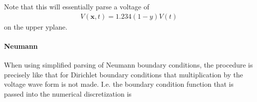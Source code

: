 \documentclass[letterpaper,10pt,english]{sphinxmanual}
\begin{document}
\begin{sphinxVerbatim}[commandchars=\\\{\},formatcom=\scriptsize]
   \PYG{p}{[}\PYG{p}{]}        
       \PYG{p}{[}\PYG{p}{]}
      

  
\end{sphinxVerbatim}

Note that this will essentially parse a voltage of
\begin{equation*}
\begin{split}V(\mathbf{x},t) = 1.234(1-y)V(t)\end{split}
\end{equation*}
on the upper y\sphinxhyphen{}plane.


\paragraph{Neumann}
\label{\detokenize{Solvers/Electrostatics:neumann}}
When using simplified parsing of Neumann boundary conditions, the procedure is precisely like that for Dirichlet boundary conditions  that multiplication by the voltage wave form is not made.
I.e. the boundary condition function that is passed into the numerical discretization is

\begin{sphinxVerbatim}[commandchars=\\\{\},formatcom=\scriptsize]
 

   \PYG{p}{[} \PYG{p}{]}        
       
\end{sphinxVerbatim}
\end{document}
